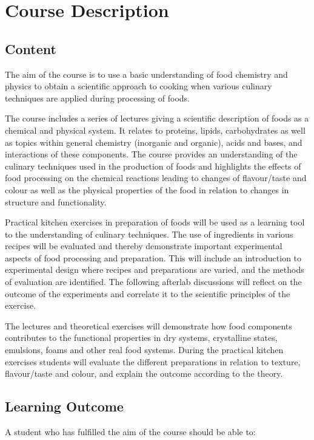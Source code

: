 \chapter{Course Description}
\section{Content}
The aim of the course is to use a basic understanding of food chemistry and physics to obtain a scientific approach to cooking when various culinary techniques are applied during processing of foods.

The course includes a series of lectures giving a scientific description of foods as a chemical and physical system. It relates to proteins, lipids, carbohydrates as well as topics within general chemistry (inorganic and organic), acids and bases, and interactions of these components. The course provides an understanding of the culinary techniques used in the production of foods and highlights the effects of food processing on the chemical reactions leading to changes of flavour/taste and colour as well as the physical properties of the food in relation to changes in structure and functionality.

Practical kitchen exercises in preparation of foods will be used as a learning tool to the understanding of culinary techniques. The use of ingredients in various recipes will be evaluated and thereby demonstrate important experimental aspects of food processing and preparation. This will include an introduction to experimental design where recipes and preparations are varied, and the methods of evaluation are identified. The following afterlab discussions will reflect on the outcome of the experiments and correlate it to the scientific principles of the exercise.

The lectures and theoretical exercises will demonstrate how food components contributes to the functional properties in dry systems, crystalline states, emulsions, foams and other real food systems. During the practical kitchen exercises students will evaluate the different preparations in relation to texture, flavour/taste and colour, and explain the outcome according to the theory.

\section{Learning Outcome}
A student who has fulfilled the aim of the course should be able to:

